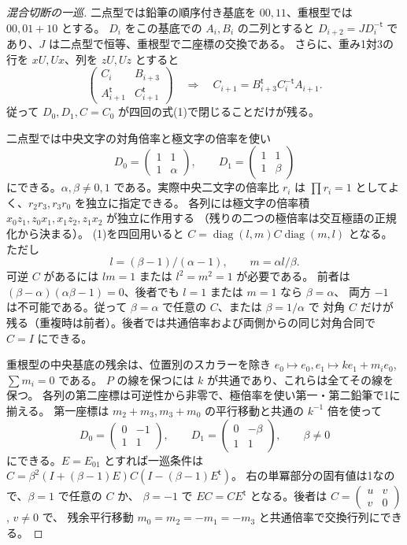 \begin{proof}[混合切断の一巡]
二点型では鉛筆の順序付き基底を $00,11$、重根型では $00,01+10$ とする。
$D_i$ をこの基底での $A_i,B_i$ の二列とすると
$D_{i+2}=J D_i^{-\mathsf t}$ であり、$J$ は二点型で恒等、重根型で二座標の交換である。
さらに、重み1対3の行を $xU,Ux$、列を $zU,Uz$ とすると
\[
 \begin{pmatrix} C_i&B_{i+3}\\ A_{i+1}^{\mathsf t}&C_{i+1}^{\mathsf t}\end{pmatrix}
 \quad\Longrightarrow\quad C_{i+1}=B_{i+3}^{\mathsf t} C_i^{-\mathsf t}A_{i+1}.
 \tag{1}
\]
従って $D_0,D_1,C=C_0$ が四回の式(1)で閉じることだけが残る。

二点型では中央文字の対角倍率と極文字の倍率を使い
\[
 D_0=\begin{pmatrix}1&1\\1&\alpha\end{pmatrix},\qquad
 D_1=\begin{pmatrix}1&1\\1&\beta\end{pmatrix}
\]
にできる。$\alpha,\beta\ne0,1$ である。実際中央二文字の倍率比 $r_i$ は
$\prod r_i=1$ としてよく、$r_2r_3,r_3r_0$ を独立に指定できる。
各列には極文字の倍率積 $x_0z_1,z_0x_1,x_1z_2,z_1x_2$ が独立に作用する
（残りの二つの極倍率は交互極語の正規化から決まる）。
(1)を四回用いると $C=\operatorname{diag}(l,m)C\operatorname{diag}(m,l)$ となる。ただし
\[
 l=(\beta-1)/(\alpha-1),\qquad m=\alpha l/\beta .
\]
可逆 $C$ があるには $lm=1$ または $l^2=m^2=1$ が必要である。
前者は $(\beta-\alpha)(\alpha\beta-1)=0$、後者でも $l=1$ または $m=1$ なら $\beta=\alpha$、
両方 $-1$ は不可能である。従って $\beta=\alpha$ で任意の $C$、または $\beta=1/\alpha$ で
対角 $C$ だけが残る（重複時は前者）。後者では共通倍率および両側からの同じ対角合同で $C=I$ にできる。

重根型の中央基底の残余は、位置別のスカラーを除き
$e_0\mapsto e_0,e_1\mapsto k e_1+m_i e_0$, $\sum m_i=0$ である。
$P$ の線を保つには $k$ が共通であり、これらは全てその線を保つ。
各列の第二座標は可逆性から非零で、極倍率を使い第一・第二鉛筆で1に揃える。
第一座標は $m_2+m_3,m_3+m_0$ の平行移動と共通の $k^{-1}$ 倍を使って
\[
 D_0=\begin{pmatrix}0&-1\\1&1\end{pmatrix},\qquad
 D_1=\begin{pmatrix}0&-\beta\\1&1\end{pmatrix},\qquad \beta\ne0
\]
にできる。$E=E_{01}$ とすれば一巡条件は
$C=\beta^2(I+(\beta-1)E) C(I-(\beta-1)E^{\mathsf t})$。
右の単冪部分の固有値は1なので、$\beta=1$ で任意の $C$ か、
$\beta=-1$ で $EC=CE^{\mathsf t}$ となる。後者は
$C=\left(\begin{smallmatrix}u&v\\v&0\end{smallmatrix}\right)$, $v\ne0$ で、
残余平行移動 $m_0=m_2=-m_1=-m_3$ と共通倍率で交換行列にできる。
\end{proof}

